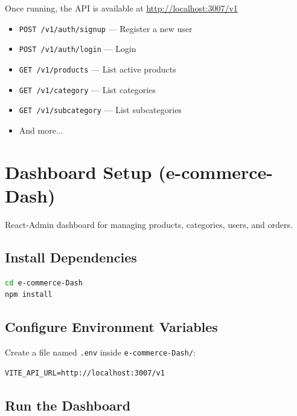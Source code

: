 \documentclass[12pt,a4paper]{article}
\begin{document}
Once running, the API is available at \url{http://localhost:3007/v1}

\begin{itemize}
    \item \texttt{POST /v1/auth/signup} — Register a new user
    \item \texttt{POST /v1/auth/login} — Login
    \item \texttt{GET /v1/products} — List active products
    \item \texttt{GET /v1/category} — List categories
    \item \texttt{GET /v1/subcategory} — List subcategories
    \item And more...
\end{itemize}

\newpage

\section{Dashboard Setup (e-commerce-Dash)}

React-Admin dashboard for managing products, categories, users, and orders.

\subsection{Install Dependencies}

\begin{lstlisting}[language=bash, caption=Install dashboard packages]
cd e-commerce-Dash
npm install
\end{lstlisting}

\subsection{Configure Environment Variables}

Create a file named \texttt{.env} inside \texttt{e-commerce-Dash/}:

\begin{lstlisting}[caption=.env for dashboard]
VITE_API_URL=http://localhost:3007/v1
\end{lstlisting}

\subsection{Run the Dashboard}
\end{document}
